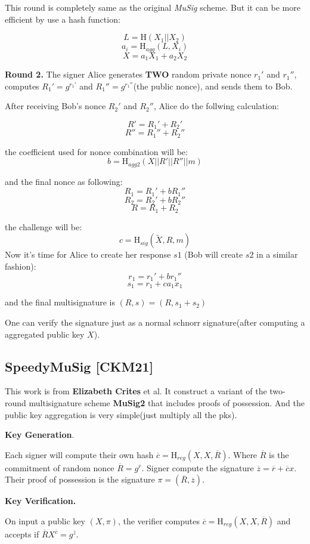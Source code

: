 \documentclass{article}
\begin{document}
This round is completely same as the original \textit{MuSig} scheme. But it can be more efficient by use a hash function:

\[
L = \textrm{H}(X_1 || X_2)
\]
\[
a_i = \textrm{H}_{agg}(L, X_i)
\]
\[
X = a_1X_1+a_2X_2
\]

\textbf{Round 2.}
The signer Alice generates \textbf{TWO} random private nonce $r_1'$ and $r_1''$, computes $R_1' = g^{r_1'}$ and $R_1'' = g^{r_1''}$(the public nonce), and sends them to Bob.

After receiving Bob's nonce $R_2'$ and $R_2''$, Alice do the follwing calculation:

\[
R' = R_1'+R_2'
\]
\[
R'' = R_1''+R_2''
\]

the coefficient used for nonce combination will be:
\[
b = \textrm{H}_{agg2}(X||R'||R''||m)
\]

and the final nonce as following:
\[
R_1 = R_1'+bR_1''
\]
\[
R_2 = R_2'+bR_2''
\]
\[
R = R_1+R_2
\]

the challenge will be:
\[
c = \textrm{H}_{sig}(\tilde{X},R,m)
\]
Now it's time for Alice to create her response $s1$ (Bob will create $s2$ in a similar fashion):
\[
r_1=r_1'+br_1''
\]
\[
s_1=r_1+ca_1x_1
\]

and the final multisignature is $(R,s) = (R, s_1+s_2)$

One can verify the signature just as a normal schnorr signature(after computing a aggregated public key $X$).

\subsection{SpeedyMuSig [CKM21]}

This work is from \textbf{Elizabeth Crites} et al. It construct a variant of the two-round multisignature scheme \textbf{MuSig2} that includes proofs of possession. And the public key aggregation is very simple(just multiply all the pks).

\textbf{Key Generation}.


Each signer will compute their own hash $\overline c = \textrm{H}_{reg}(X,X,\overline R)$. Where $\overline R$ is the commitment of random nonce $\overline R = g^{\overline r}$. Signer compute the signature $\overline z = \overline r +\overline c x$. Their proof of possession is the signature $\pi = (\overline R, \overline z)$.


\textbf{Key Verification.}


On input a public key $(X,\pi)$, the verifier computes $\overline c = \textrm{H}_{reg}(X,X,\overline R)$ and accepts if $\overline R X^{\overline c} = g^{\overline z}$.
\end{document}
